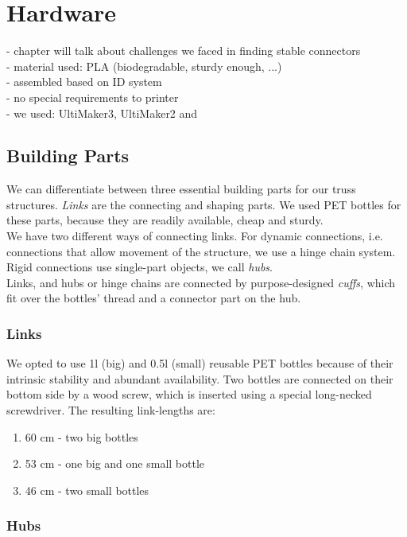 \chapter{Hardware}\label{ch:hardware}
- chapter will talk about challenges we faced in finding stable connectors\\
- material used: PLA (biodegradable, sturdy enough, ...)\\
- assembled based on ID system\\
- no special requirements to printer\\
- we used: UltiMaker3, UltiMaker2 and 

\section{Building Parts}
We can differentiate between three essential building parts for our truss structures. \textit{Links} are the connecting and shaping parts. We used PET bottles for these parts, because they are readily available, cheap and sturdy.\\
We have two different ways of connecting links. For dynamic connections, i.e. connections that allow movement of the structure, we use a hinge chain system. Rigid connections use single-part objects, we call \textit{hubs}.\\
Links, and hubs or hinge chains are connected by purpose-designed \textit{cuffs}, which fit over the bottles' thread and a connector part on the hub.

\subsection{Links}
We opted to use 1l (big) and 0.5l (small) reusable PET bottles because of their intrinsic stability and abundant availability. Two bottles are connected on their bottom side by a wood screw, which is inserted using a special long-necked screwdriver. The resulting link-lengths are:
\begin{enumerate}
\item 60 cm - two big bottles
\item 53 cm - one big and one small bottle
\item 46 cm - two small bottles
\end{enumerate}

\subsection{Hubs}

